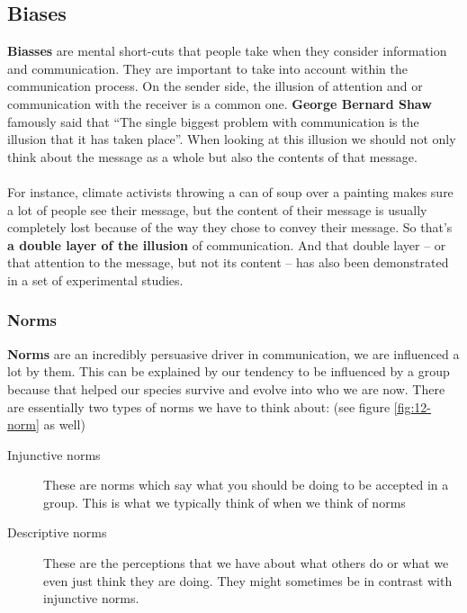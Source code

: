 \documentclass[../summary.tex]{subfiles}
\begin{document}
		\subsection{Biases}
			\textbf{Biasses} are mental short-cuts that people take when they consider information and communication. They are important to take into account within the communication process. On the sender side, the illusion of attention and or communication with the receiver is a common one. \textbf{George Bernard Shaw} famously said that ``The single biggest problem with communication is the illusion that it has taken place''. When looking at this illusion we should not only think about the message as a whole but also the contents of that message. \\
			\\
			For instance, climate activists throwing a can of soup over a painting makes sure a lot of people see their message, but the content of their message is usually completely lost because of the way they  chose to convey their message.  So that's \textbf{a double layer of the illusion} of communication. And that double layer -- or that attention to the message, but not its content -- has also been demonstrated in a set of experimental studies. 
			
			\newpage
			
			\subsubsection{Norms}
				\textbf{Norms} are an incredibly persuasive driver in communication, we are influenced a lot by them. This can be explained by our tendency  to be influenced by a group because that helped our species survive and evolve into who we are now. There are essentially two types of norms we have to think about: (see figure \ref{fig:12-norm} as well)
				\begin{description}
					\item[Injunctive norms] These are norms which say what you should be doing to be accepted in a group. This is what we typically think of when we think of norms
					\item[Descriptive norms] These are the perceptions that we have about what others do or what we even just think they are doing. They might sometimes be in contrast with injunctive norms. 
				\end{description}
				
\end{document}
